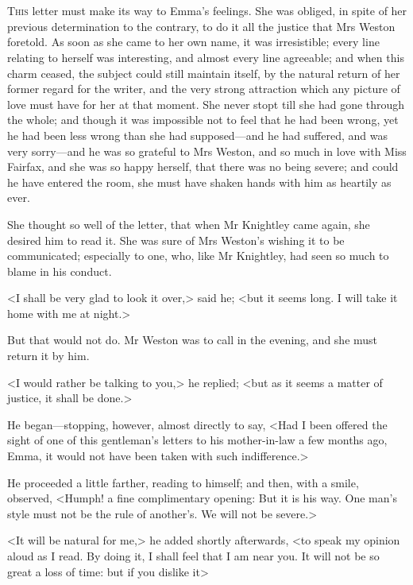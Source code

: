 \chapter[Chapter \thechapter]{}
\lettrine[lraise=0.3]{T}{his} letter must make its way to Emma's feelings. She was obliged, in spite of her previous determination to the contrary, to do it all the justice that Mrs Weston foretold. As soon as she came to her own name, it was irresistible; every line relating to herself was interesting, and almost every line agreeable; and when this charm ceased, the subject could still maintain itself, by the natural return of her former regard for the writer, and the very strong attraction which any picture of love must have for her at that moment. She never stopt till she had gone through the whole; and though it was impossible not to feel that he had been wrong, yet he had been less wrong than she had supposed—and he had suffered, and was very sorry—and he was so grateful to Mrs Weston, and so much in love with Miss Fairfax, and she was so happy herself, that there was no being severe; and could he have entered the room, she must have shaken hands with him as heartily as ever.

She thought so well of the letter, that when Mr Knightley came again, she desired him to read it. She was sure of Mrs Weston's wishing it to be communicated; especially to one, who, like Mr Knightley, had seen so much to blame in his conduct.

<I shall be very glad to look it over,> said he; <but it seems long. I will take it home with me at night.>

But that would not do. Mr Weston was to call in the evening, and she must return it by him.

<I would rather be talking to you,> he replied; <but as it seems a matter of justice, it shall be done.>

He began—stopping, however, almost directly to say, <Had I been offered the sight of one of this gentleman's letters to his mother-in-law a few months ago, Emma, it would not have been taken with such indifference.>

He proceeded a little farther, reading to himself; and then, with a smile, observed, <Humph! a fine complimentary opening: But it is his way. One man's style must not be the rule of another's. We will not be severe.>

<It will be natural for me,> he added shortly afterwards, <to speak my opinion aloud as I read. By doing it, I shall feel that I am near you. It will not be so great a loss of time: but if you dislike it\longdash>


